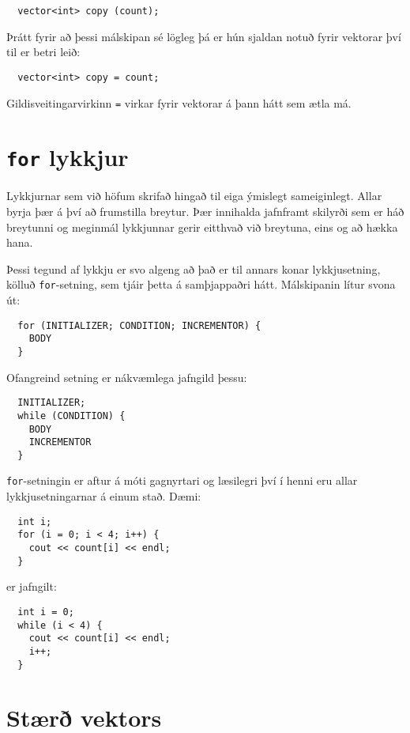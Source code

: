\begin{verbatim}
  vector<int> copy (count);
\end{verbatim}
%
Þrátt fyrir að þessi málskipan sé lögleg þá er hún sjaldan notuð fyrir vektorar því til er betri leið:

\begin{verbatim}
  vector<int> copy = count;
\end{verbatim}
%
Gildisveitingarvirkinn {\tt =} virkar fyrir vektorar á þann hátt sem ætla má.

\section{{\tt for} lykkjur}

Lykkjurnar sem við höfum skrifað hingað til eiga ýmislegt sameiginlegt.
Allar byrja þær á því að frumstilla breytur.
Þær innihalda jafnframt skilyrði sem er háð breytunni og meginmál lykkjunnar gerir eitthvað við breytuna, eins og að hækka hana. 


Þessi tegund af lykkju er svo algeng að það er til annars konar lykkjusetning, kölluð {\tt for}-setning, sem tjáir þetta á samþjappaðri hátt.
Málskipanin lítur svona út:

\begin{verbatim}
  for (INITIALIZER; CONDITION; INCREMENTOR) {
    BODY
  }
\end{verbatim}
%
Ofangreind setning er nákvæmlega jafngild þessu:

\begin{verbatim}
  INITIALIZER;
  while (CONDITION) {
    BODY
    INCREMENTOR
  }
\end{verbatim}
%
{\tt for}-setningin er aftur á móti gagnyrtari og læsilegri því í henni eru allar lykkjusetningarnar á einum stað.
Dæmi:

\begin{verbatim}
  int i;
  for (i = 0; i < 4; i++) {
    cout << count[i] << endl;
  }
\end{verbatim}
%
er jafngilt:

\begin{verbatim}
  int i = 0;
  while (i < 4) {
    cout << count[i] << endl;
    i++;
  }
\end{verbatim}

\section{Stærð vektors}


